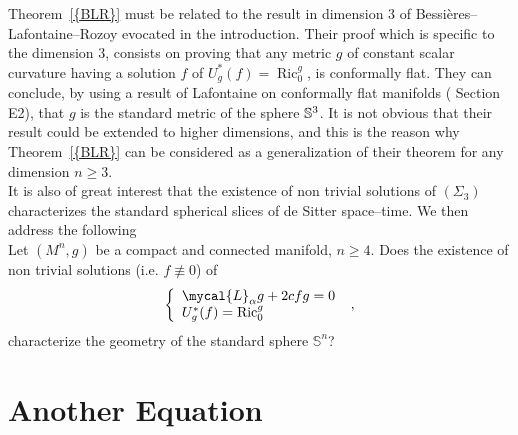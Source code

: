 \documentclass[a4paper,11pt,leqno]{amsart}
\numberwithin{equation}{section}
\theoremstyle{main}
\begin{document}
Theorem~{\ref{{BLR}}} must be related to the result in dimension 3 of Bessières--Lafontaine--Rozoy \cite{BLR} evocated in the introduction. Their proof which is specific to the dimension 3, consists on proving that any metric $g$ of constant scalar curvature having a solution $f$ of $U^*_g(f)={\operatorname{Ric}}_0^g$, is conformally flat. They can conclude, by using a result of Lafontaine on conformally flat manifolds (\cite{L} Section E2), that $g$ is the standard metric of the sphere $\Bbb S^3$. It is not obvious that their result could be extended to higher dimensions, and this is the reason why Theorem~{\ref{{BLR}}} can be considered as a generalization of their theorem for any dimension $n\ge3$.\\
It is also of great interest that the existence of non trivial solutions of $(\Sigma_3)$ characterizes the standard spherical slices of de Sitter space--time. We then address the following\\
{} Let $(M^n,g)$ be a compact and connected manifold, $n\ge 4$. Does the existence of non trivial solutions (i.e. $f\not\equiv 0$) of 
$$\left\{
\begin{array}{l}
	 \mycal{L}_\alpha g + 2cfg= 0 \\
	 U_g^* (f)={\operatorname{Ric}}^g_0
\end{array}\right. \ ,$$
characterize the geometry of the standard sphere ${{\mathbb S^{n}}}$? 
 
 

\section{Another Equation}\label{4}
\end{document}

